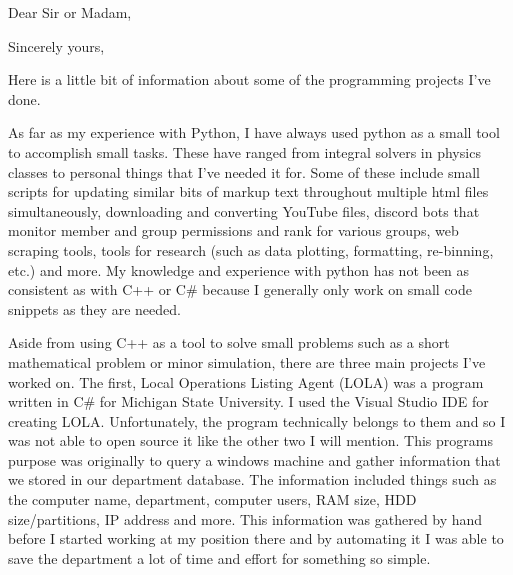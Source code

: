 \documentclass[11pt,a4paper,sans]{moderncv} %
\begin{document}
\makecvtitle 



\date{\today} %
\opening{Dear Sir or Madam,} %

\closing{Sincerely yours,} %

\makelettertitle %

\hspace{1cm}Here is a little bit of information about some of the programming projects I’ve done.
 
\hspace{1cm}As far as my experience with Python, I have always used python as a small tool to accomplish small tasks. These have ranged from integral solvers in physics classes to personal things that I’ve needed it for. Some of these include small scripts for updating similar bits of markup text throughout multiple html files simultaneously, downloading and converting YouTube files, discord bots that monitor member and group permissions and rank for various groups, web scraping tools, tools for research (such as data plotting, formatting, re-binning, etc.) and more. My knowledge and experience with python has not been as consistent as with C++ or C\# because I generally only work on small code snippets as they are needed. 

\hspace{1cm}Aside from using C++ as a tool to solve small problems such as a short mathematical problem or minor simulation, there are three main projects I’ve worked on. The first, Local Operations Listing Agent (LOLA) was a program written in C\# for Michigan State University. I used the Visual Studio IDE for creating LOLA. Unfortunately, the program technically belongs to them and so I was not able to open source it like the other two I will mention. This programs purpose was originally to query a windows machine and gather information that we stored in our department database. The information included things such as the computer name, department, computer users, RAM size, HDD size/partitions, IP address and more. This information was gathered by hand before I started working at my position there and by automating it I was able to save the department a lot of time and effort for something so simple. 
\end{document}

